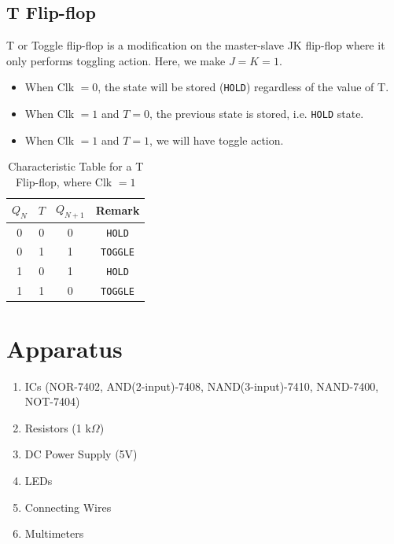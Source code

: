 \subsection*{T Flip-flop}
T or Toggle flip-flop is a modification on the master-slave JK flip-flop where it only performs toggling action. Here, we make $J=K=1$.
\begin{itemize}
    \item When Clk $=0$, the state will be stored (\verb|HOLD|) regardless of the value of T.
    \item When Clk $=1$ and $T=0$, the previous state is stored, i.e. \verb|HOLD| state.
    \item When Clk $=1$ and $T=1$, we will have toggle action.\\
\end{itemize} 

\begin{table}[H]
    \centering
    \begin{tabular}{|c|c|c|c|}\hline
        $Q_N$ & $T$ & $Q_{N+1}$ & Remark\\ \hline
        0 & 0 & 0 & \verb|HOLD| \\ 
        0 & 1 & 1 & \verb|TOGGLE| \\ 
        1 & 0 & 1 & \verb|HOLD| \\ 
        1 & 1 & 0 & \verb|TOGGLE|\\ \hline
    \end{tabular}
    \caption{Characteristic Table for a T Flip-flop, where Clk $=1$}
\end{table}
\section{Apparatus}

\begin{enumerate}
    \item ICs (NOR-7402, AND(2-input)-7408, NAND(3-input)-7410, NAND-7400, NOT-7404)
    \item Resistors (1 k$\Omega$)
    \item DC Power Supply (5V)
    \item LEDs
    \item Connecting Wires
    \item Multimeters
\end{enumerate}
